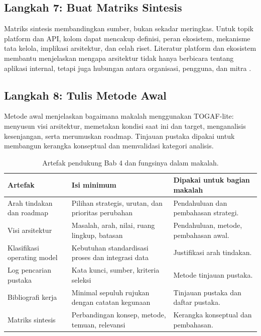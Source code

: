 \subsection{Langkah 7: Buat Matriks Sintesis}

Matriks sintesis membandingkan sumber, bukan sekadar meringkas. Untuk topik
platform dan API, kolom dapat mencakup definisi, peran ekosistem, mekanisme tata
kelola, implikasi arsitektur, dan celah riset. Literatur platform dan ekosistem
membantu menjelaskan mengapa arsitektur tidak hanya berbicara tentang aplikasi
internal, tetapi juga hubungan antara organisasi, pengguna, dan mitra
\cite{parker2016platform,cusumano2019business,evans2016matchmakers}.

\subsection{Langkah 8: Tulis Metode Awal}

Metode awal menjelaskan bagaimana makalah menggunakan TOGAF-lite: menyusun visi
arsitektur, memetakan kondisi saat ini dan target, menganalisis kesenjangan,
serta merumuskan roadmap. Tinjauan pustaka dipakai untuk membangun kerangka
konseptual dan memvalidasi kategori analisis.

\begin{table}[htbp]
\centering
\scriptsize
\caption{Artefak pendukung Bab 4 dan fungsinya dalam makalah.}
\label{tab:artefak-bab3}
\begin{tabularx}{\textwidth}{@{}p{} p{} X@{}}
\hline
\textbf{Artefak} & \textbf{Isi minimum} & \textbf{Dipakai untuk bagian makalah} \\
\hline
Arah tindakan dan roadmap & Pilihan strategis, urutan, dan prioritas perubahan
& Pendahuluan dan pembahasan strategi. \\
Visi arsitektur & Masalah, arah, nilai, ruang lingkup, batasan & Pendahuluan,
metode, pembahasan awal. \\
Klasifikasi operating model & Kebutuhan standardisasi proses dan integrasi data
& Justifikasi arah tindakan. \\
Log pencarian pustaka & Kata kunci, sumber, kriteria seleksi & Metode tinjauan
pustaka. \\
Bibliografi kerja & Minimal sepuluh rujukan dengan catatan kegunaan & Tinjauan
pustaka dan daftar pustaka. \\
Matriks sintesis & Perbandingan konsep, metode, temuan, relevansi & Kerangka
konseptual dan pembahasan. \\
\hline
\end{tabularx}
\end{table}

